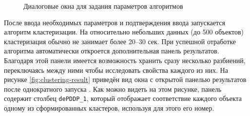\documentclass[12pt]{diploma}
\begin{document}
	\begin{figure}[h!] %
		\begin{subfigmatrix}{2}
		\centering
	\end{subfigmatrix}
		\caption{Диалоговые окна для задания параметров алгоритмов}
		\label{fig:alg-dialogs}
	\end{figure}
	
	После ввода необходимых параметров и подтверждения ввода запускается алгоритм кластеризации. На относительно небольших данных (до 500 объектов) кластеризация обычно не занимает более 20--30 сек. При успешной отработке алгоритма автоматически откроется дополнительная панель результатов. Благодаря этой панели имеется возможность хранить сразу несколько разбиений, переключаясь между ними чтобы исследовать свойства каждого из них. На рисунке \ref{fig:clustering-result} приведён вид окна с открытой панелью результатов после однократного запуска \dePDDP. Как можно видеть на этом рисунке, панель содержит столбец \texttt{dePDDP\_1}, который отображает соответствие каждого объекта одному из сформированных кластеров, используя для этого его номер.
	
\end{document}
